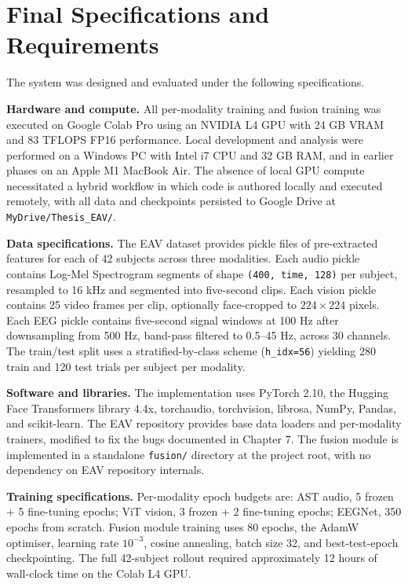 \section{Final Specifications and Requirements}
The system was designed and evaluated under the following specifications.

\textbf{Hardware and compute.} All per-modality training and fusion training was executed on Google Colab Pro using an NVIDIA L4 GPU with 24 GB VRAM and 83 TFLOPS FP16 performance. Local development and analysis were performed on a Windows PC with Intel i7 CPU and 32 GB RAM, and in earlier phases on an Apple M1 MacBook Air. The absence of local GPU compute necessitated a hybrid workflow in which code is authored locally and executed remotely, with all data and checkpoints persisted to Google Drive at \texttt{MyDrive/Thesis\_EAV/}.

\textbf{Data specifications.} The EAV dataset provides pickle files of pre-extracted features for each of 42 subjects across three modalities. Each audio pickle contains Log-Mel Spectrogram segments of shape \texttt{(400, time, 128)} per subject, resampled to 16 kHz and segmented into five-second clips. Each vision pickle contains 25 video frames per clip, optionally face-cropped to $224\times224$ pixels. Each EEG pickle contains five-second signal windows at 100 Hz after downsampling from 500 Hz, band-pass filtered to 0.5--45 Hz, across 30 channels. The train/test split uses a stratified-by-class scheme (\texttt{h\_idx=56}) yielding 280 train and 120 test trials per subject per modality.

\textbf{Software and libraries.} The implementation uses PyTorch 2.10, the Hugging Face Transformers library 4.4x, torchaudio, torchvision, librosa, NumPy, Pandas, and scikit-learn. The EAV repository provides base data loaders and per-modality trainers, modified to fix the bugs documented in Chapter 7. The fusion module is implemented in a standalone \texttt{fusion/} directory at the project root, with no dependency on EAV repository internals.

\textbf{Training specifications.} Per-modality epoch budgets are: AST audio, 5 frozen + 5 fine-tuning epochs; ViT vision, 3 frozen + 2 fine-tuning epochs; EEGNet, 350 epochs from scratch. Fusion module training uses 80 epochs, the AdamW optimiser, learning rate $10^{-3}$, cosine annealing, batch size 32, and best-test-epoch checkpointing. The full 42-subject rollout required approximately 12 hours of wall-clock time on the Colab L4 GPU.

